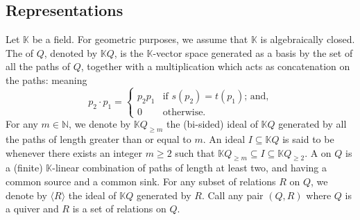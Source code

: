 \subsection{Representations}
\label{ss:Reps}

Let $\mathbb{K}$ be a field. For geometric purposes, we assume that $\mathbb{K}$ is algebraically closed. The  of $Q$, denoted by $\mathbb{K}Q$, is the $\mathbb{K}$-vector space generated as a basis by the set of all the paths of $Q$, together with a multiplication which acts as concatenation on the paths: meaning \[p_2 \cdot p_1 = \begin{cases}
    p_2p_1 & \text{if } s(p_2) = t(p_1) \text{; and,} \\
    0 & \text{otherwise.}
\end{cases}\] For any $m \in \mathbb{N}$, we denote by $\mathbb{K}Q_{\geqslant m}$ the (bi-sided) ideal of $\mathbb{K}Q$ generated by all the paths of length greater than or equal to $m$. An ideal $I \subseteq \mathbb{K}Q$ is said to be  whenever there exists an integer $m \geqslant 2$ such that $\mathbb{K}Q_{\geqslant m} \subseteq  I \subseteq \mathbb{K} Q_{\geqslant 2}$. A  on $Q$ is a (finite) $\mathbb{K}$-linear combination of paths of length at least two, and having a common source and a common sink. For any subset of relations $R$ on $Q$, we denote by $\langle R \rangle$ the ideal of $\mathbb{K}Q$ generated by $R$. Call  any pair $(Q,R)$ where $Q$ is a quiver and $R$ is a set of relations on $Q$.

